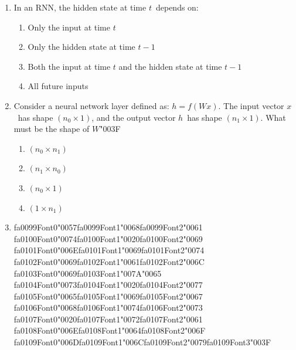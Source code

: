 \documentclass[12pt]{article}
\begin{document}
\begin{enumerate}[label=Q\arabic*.]
\begin{enumerate}[label=(\Alph*)]
    \item The current word given itself
    \item All words simultaneously
\end{enumerate}
\item In an RNN, the hidden state at time $t$\ depends on:
\begin{enumerate}[label=(\Alph*)]
    \item Only the input at time $t$
    \item Only the hidden state at time $t-1$
    \item Both the input at time $t$ and the hidden state at time $t-1$
    \item All future inputs
\end{enumerate}
\item Consider a neural network layer defined as: $h = f(Wx)$. The input vector $x$\ has shape $(n_0 \times 1)$, and the output vector $h$\ has shape $(n_1 \times 1)$. What must be the shape of $W${\char"003F}
\begin{enumerate}[label=(\Alph*)]
    \item $(n_0 \times n_1)$
    \item $(n_1 \times n_0)$
    \item $(n_0 \times 1)$
    \item $(1 \times n_1)$
\end{enumerate}
\item {\csname fa0099Font0\endcsname\char"0057}{\csname fa0099Font1\endcsname\char"0068}{\csname fa0099Font2\endcsname\char"0061} {\csname fa0100Font0\endcsname\char"0074}{\csname fa0100Font1\endcsname\char"0020}{\csname fa0100Font2\endcsname\char"0069} {\csname fa0101Font0\endcsname\char"006E}{\csname fa0101Font1\endcsname\char"0069}{\csname fa0101Font2\endcsname\char"0074} {\csname fa0102Font0\endcsname\char"0069}{\csname fa0102Font1\endcsname\char"0061}{\csname fa0102Font2\endcsname\char"006C} {\csname fa0103Font0\endcsname\char"0069}{\csname fa0103Font1\endcsname\char"007A}{\char"0065} {\csname fa0104Font0\endcsname\char"0073}{\csname fa0104Font1\endcsname\char"0020}{\csname fa0104Font2\endcsname\char"0077} {\csname fa0105Font0\endcsname\char"0065}{\csname fa0105Font1\endcsname\char"0069}{\csname fa0105Font2\endcsname\char"0067} {\csname fa0106Font0\endcsname\char"0068}{\csname fa0106Font1\endcsname\char"0074}{\csname fa0106Font2\endcsname\char"0073} {\csname fa0107Font0\endcsname\char"0020}{\csname fa0107Font1\endcsname\char"0072}{\csname fa0107Font2\endcsname\char"0061} {\csname fa0108Font0\endcsname\char"006E}{\csname fa0108Font1\endcsname\char"0064}{\csname fa0108Font2\endcsname\char"006F} {\csname fa0109Font0\endcsname\char"006D}{\csname fa0109Font1\endcsname\char"006C}{\csname fa0109Font2\endcsname\char"0079}{\csname fa0109Font3\endcsname\char"003F}

\end{enumerate}
\end{document}

